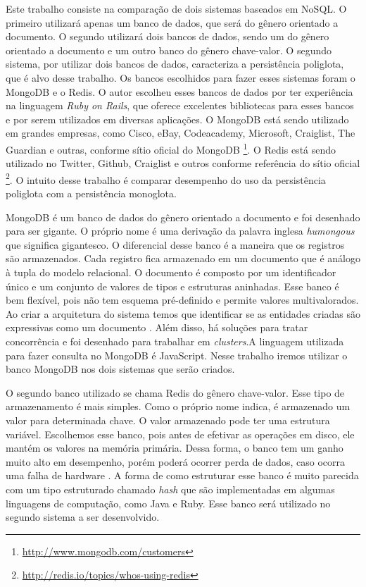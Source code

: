 Este trabalho consiste na comparação de dois sistemas baseados em NoSQL. O primeiro utilizará apenas um banco de dados, que será do gênero orientado a documento. O segundo utilizará dois bancos de dados, sendo um do gênero orientado a documento e um outro banco do gênero chave-valor. O segundo sistema, por utilizar dois bancos de dados, caracteriza a persistência poliglota, que é alvo desse trabalho. Os bancos escolhidos para fazer esses sistemas foram o MongoDB e o \ac{Redis}. O autor escolheu esses bancos de dados por ter experiência na linguagem \textit{Ruby on Rails}, que oferece excelentes bibliotecas para esses bancos e por serem utilizados em diversas aplicações. O MongoDB está sendo utilizado em grandes empresas, como Cisco, eBay, Codeacademy, Microsoft, Craiglist, The Guardian e outras, conforme sítio oficial do MongoDB \footnote{\url{http://www.mongodb.com/customers}}. O \ac{Redis} está sendo utilizado no Twitter, Github, Craiglist e outros conforme referência do sítio oficial \footnote{\url{http://redis.io/topics/whos-using-redis}}.
O intuito desse trabalho é comparar desempenho do uso da persistência poliglota  com a persistência monoglota.

MongoDB é um banco de dados do gênero orientado a documento e foi desenhado para ser gigante. O próprio nome é uma derivação da palavra inglesa \textit{humongous} que significa gigantesco. O diferencial desse banco é a maneira que os registros são armazenados. Cada registro fica armazenado em um documento que é análogo à tupla do modelo relacional. O documento é composto por um identificador único e um conjunto de valores de tipos e estruturas aninhadas. Esse banco é bem flexível, pois não tem esquema pré-definido e permite valores multivalorados. Ao criar a arquitetura do sistema temos que identificar se as entidades criadas são expressivas como um documento \cite{SDSW}. Além disso, há soluções para tratar concorrência e foi desenhado para trabalhar em \textit{clusters}.A linguagem utilizada para fazer consulta no MongoDB é JavaScript. Nesse trabalho iremos utilizar o banco MongoDB nos dois sistemas que serão criados.

O segundo banco utilizado se chama \ac{Redis} do gênero chave-valor. Esse tipo de armazenamento é mais simples. Como o próprio nome indica, é armazenado um valor para determinada chave. O valor armazenado pode ter uma estrutura variável. Escolhemos esse banco, pois antes de efetivar as operações em disco, ele mantém os valores na memória primária. Dessa forma, o banco tem um ganho muito alto em desempenho, porém poderá ocorrer perda de dados, caso ocorra uma falha de hardware \cite{SDSW}. A forma de como estruturar esse banco é muito parecida com um tipo estruturado chamado \textit{hash} que são implementadas em algumas linguagens de computação, como Java e Ruby. Esse banco será utilizado no segundo sistema a ser desenvolvido.


